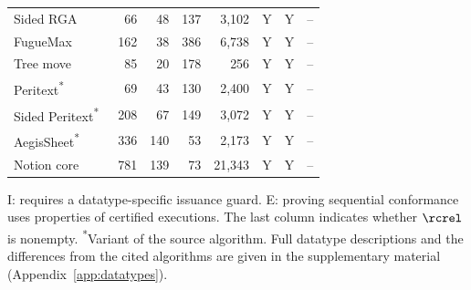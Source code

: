 \begin{table}[t]
\begin{tabular}{@{}lrrrrccc@{}}
Sided RGA~\cite{Roh,FugueMax} & 66 & 48 & 137 & 3,102 & Y & Y & -- \\
FugueMax~\cite{FugueMax} & 162 & 38 & 386 & 6,738 & Y & Y & -- \\
Tree move~\cite{TreeMove} & 85 & 20 & 178 & 256 & Y & Y & -- \\
Peritext\textsuperscript{*}~\cite{Peritext} & 69 & 43 & 130 & 2,400 & Y & Y & -- \\
Sided Peritext\textsuperscript{*}~\cite{Peritext} & 208 & 67 & 149 & 3,072 & Y & Y & -- \\
AegisSheet\textsuperscript{*}~\cite{AegisSheet} & 336 & 140 & 53 & 2,173 & Y & Y & -- \\
Notion core~\cite{NotionCRDTBlog} & 781 & 139 & 73 & 21,343 & Y & Y & -- \\
\bottomrule
\end{tabular}
\par\smallskip
\begin{minipage}{\linewidth}
\footnotesize
I: requires a datatype-specific issuance guard. E: proving sequential conformance uses properties of certified executions. The last column indicates whether $\rcrel$ is nonempty. \textsuperscript{*}Variant of the source algorithm. Full datatype descriptions and the differences from the cited algorithms are given in the supplementary material (Appendix~\ref{app:datatypes}).
\end{minipage}
\end{table}
